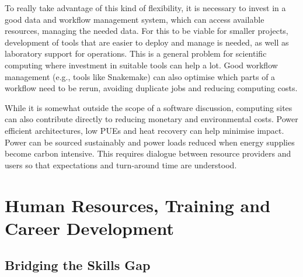 To really take advantage of this kind of flexibility, it is necessary to invest in a good data and workflow management system, which can access available resources, managing the needed data. For this to be viable for smaller projects, development of tools that are easier to deploy and manage is needed, as well as laboratory support for operations. This is a general problem for scientific computing where investment in suitable tools can help a lot. Good workflow management (e.g., tools like Snakemake) can also optimise which parts of a workflow need to be rerun, avoiding duplicate jobs and reducing computing costs.

While it is somewhat outside the scope of a software discussion, computing sites can also contribute directly to reducing monetary and environmental costs. Power efficient architectures, low PUEs and heat recovery can help minimise impact. Power can be sourced sustainably and power loads reduced when energy supplies become carbon intensive. This requires dialogue between resource providers and users so that expectations and turn-around time are understood.


\section{Human Resources, Training and Career Development}

\subsection{Bridging the Skills Gap}


